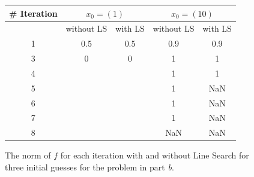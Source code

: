 \begin{figure}[tbh]
 \centering
\begin{tabular}{ |c || c|c || c|c |}
 \hline
 \# Iteration  &\multicolumn{2}{|c||}{$x_{0}=(1)$} & \multicolumn{2}{|c|}{$x_{0}=(10)$} \\ 
  \hline
 	& without LS & with LS & without LS & with LS\\
  \hhline{|=|=|=|=|=|}                           
1 &0.5		      & 0.5		     &0.9	   &0.9\\
\hline
3 & 0		      & 0    	     &1	       &1\\                                                                  
\hline
4 & 		      &     	     &1	       &1\\                                                                  
\hline
5 & 		      &     	     &1	       &NaN\\                                                                  
\hline
6 & 		      &     	     &1	       &NaN\\                                                                  
\hline
7 & 		      &     	     &1	       &NaN\\                                                                  
\hline
8 & 		      &     	     &NaN      &NaN\\
\hline
\end{tabular} 
  \caption{The norm of $f$ for each iteration with and without Line Search for three initial guesses for the problem in part \emph{b}.}
   \label{tab:part_b}
\end{figure} 




